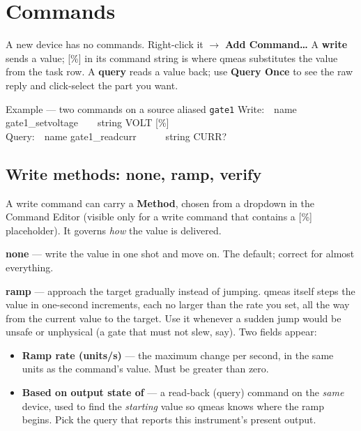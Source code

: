 \documentclass[11pt,a4paper]{article}
\newcommand{\code}[1]{{\ttfamily\color{qcode}#1}}
\begin{document}
\section{Commands}

A new device has no commands. Right-click it $\rightarrow$ \textbf{Add
Command\ldots} A \textbf{write} sends a value; \code{[\%]} in its command
string is where qmeas substitutes the value from the task row. A
\textbf{query} reads a value back; use \textbf{Query Once} to see the raw
reply and click-select the part you want.

\begin{gridex}{Example --- two commands on a source aliased \texttt{gate1}}
Write:\ \ name gate1\_setvoltage\ \ \ \ string  VOLT [\%]\\
Query:\ \ name gate1\_readcurr\ \ \ \ \ \ string  CURR?
\end{gridex}

\subsection{Write methods: none, ramp, verify}\label{sec:methods}

A write command can carry a \textbf{Method}, chosen from a dropdown in the
Command Editor (visible only for a write command that contains a \code{[\%]}
placeholder). It governs \emph{how} the value is delivered.

\textbf{none} --- write the value in one shot and move on. The default;
correct for almost everything.

\textbf{ramp} --- approach the target gradually instead of jumping. qmeas
itself steps the value in one-second increments, each no larger than the
rate you set, all the way from the current value to the target. Use it
whenever a sudden jump would be unsafe or unphysical (a gate that must not
slew, say). Two fields appear:

\begin{itemize}
  \item \textbf{Ramp rate (units/s)} --- the maximum change per second, in
  the same units as the command's value. Must be greater than zero.
  \item \textbf{Based on output state of} --- a read-back (query) command on
  the \emph{same} device, used to find the \emph{starting} value so qmeas
  knows where the ramp begins. Pick the query that reports this instrument's
  present output.
\end{itemize}
\end{document}

